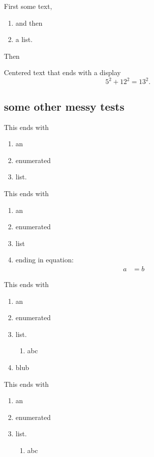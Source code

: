 \begin{note}
  First some text,
  \begin{enumerate}
  \item and then
  \item a list.
  \end{enumerate}
  Then
  \begin{center}
    Centered text that ends with a display
    \[
      5^2 + 12^2 = 13^2.
    \]
  \end{center}
\end{note}

\subsection{some other messy tests}

\begin{theorem}
  This ends with
  \begin{enumerate}
  \item an
  \item enumerated
  \item list.
  \end{enumerate}
\end{theorem}

\begin{theorem}
  This ends with
  \begin{enumerate}
  \item an
  \item enumerated
  \item list
  \item ending in equation:
  \begin{align*}
  a&=b
  \end{align*}
  \end{enumerate}
\end{theorem}

\begin{theorem}
  This ends with
  \begin{enumerate}
  \item an
  \item enumerated
  \item list.
  \begin{enumerate}
  \item abc
  \end{enumerate}
  \item blub
  \end{enumerate}
\end{theorem}

\begin{theorem}
  This ends with
  \begin{enumerate}
  \item an
  \item enumerated
  \item list.
  \begin{enumerate}
  \item abc
  \end{enumerate}
  \end{enumerate}
\end{theorem}

